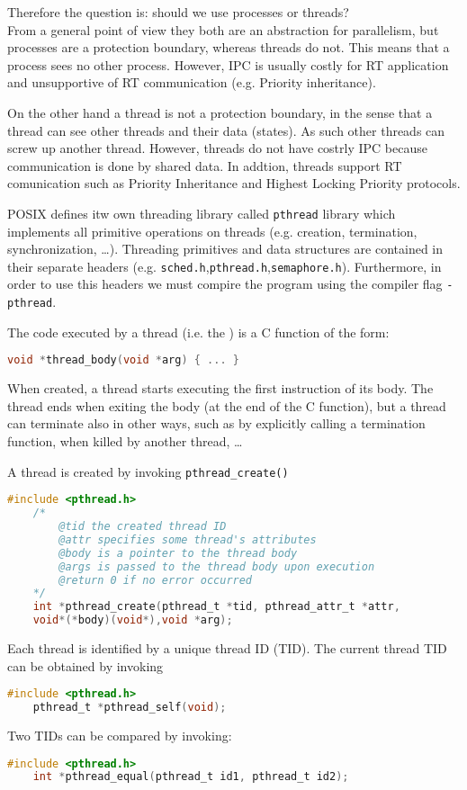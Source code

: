 Therefore the question is: should we use processes or threads?\\
From a general point of view they both are an abstraction for parallelism, but processes are a protection boundary, whereas threads do not.
This means that a process sees no other process. However, IPC is usually costly for RT application and unsupportive of RT communication (e.g. Priority inheritance).

On the other hand a thread is not a protection boundary, in the sense that a thread can see other threads and their data (states). As such other threads can screw up another thread. However, threads do not have costrly IPC because communication is done by shared data. In addtion, threads support RT comunication such as Priority Inheritance and Highest Locking Priority protocols.


POSIX defines itw own threading library called \texttt{pthread} library which implements all primitive operations on threads (e.g. creation, termination, synchronization, \dots).
Threading primitives and data structures are contained in their separate headers (e.g. \texttt{sched.h},\texttt{pthread.h},\texttt{semaphore.h}).
Furthermore, in order to use this headers we must compire the program using the compiler flag \texttt{-pthread}.


The code executed by a thread (i.e. the ) is a C function of the form:
\begin{lstlisting}[language=C]
    void *thread_body(void *arg) { ... }
\end{lstlisting}
When created, a thread starts executing the first instruction of its body. The thread ends when exiting the body (at the end of the C function), but a thread can terminate also in other ways, such as by explicitly calling a termination function, when killed by another thread, \dots

A thread is created by invoking \texttt{pthread\_create()}
\begin{lstlisting}[language=C]
    #include <pthread.h>
    /*
        @tid the created thread ID
        @attr specifies some thread's attributes
        @body is a pointer to the thread body
        @args is passed to the thread body upon execution
        @return 0 if no error occurred 
    */
    int *pthread_create(pthread_t *tid, pthread_attr_t *attr,
    void*(*body)(void*),void *arg);
\end{lstlisting}

Each thread is identified by a unique thread ID (TID).
The current thread TID can be obtained by invoking 
\begin{lstlisting}[language=C]
    #include <pthread.h>
    pthread_t *pthread_self(void);
\end{lstlisting}
Two TIDs can be compared by invoking:
\begin{lstlisting}[language=C]
    #include <pthread.h>
    int *pthread_equal(pthread_t id1, pthread_t id2);
\end{lstlisting}

